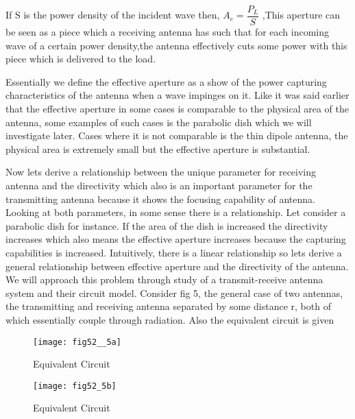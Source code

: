 If S is the power density of the incident wave then,
\newline $A_{e}=\dfrac{P_{L}}{S}$ ,This aperture can be seen as a piece which a receiving antenna has such that for each incoming wave of a certain power density,the antenna effectively cuts some power with this piece which is delivered to the load.
\newline

Essentially we define the effective aperture as a show of the power capturing characteristics of the antenna when a wave impinges on it. Like it was said earlier that the effective aperture in some cases is comparable to the physical area of the antenna, some examples of such cases is the parabolic dish which we will investigate later. Cases where it is not comparable is the thin dipole antenna, the physical area is extremely small but the effective aperture is substantial.
\newline 

Now lets derive a relationship between the unique parameter for receiving antenna and the directivity which also is an important parameter for the transmitting antenna because it shows the focusing capability of antenna. Looking at both parameters, in some sense there is a relationship. Let consider a parabolic dish for instance. If the area of the dish is increased the directivity increases which also means the effective aperture increases because the capturing capabilities is increased. Intuitively, there is a linear relationship so lets derive a general relationship between effective aperture and the directivity of the antenna. We will approach this problem through study of a transmit-receive antenna system and their circuit model. Consider fig 5, the general case of two antennas, the transmitting and receiving antenna separated by some distance r, both of which essentially couple through radiation. Also the equivalent circuit is given

\begin{figure}
	\texttt{[image: fig52\_\_5a]}
	\centering
	\caption{Equivalent Circuit}
	\label{fig5b}	
\end{figure}

\begin{figure}
	\texttt{[image: fig52\_5b]}
	\centering
	\caption{Equivalent Circuit}
	\label{fig 1}	
\end{figure}

